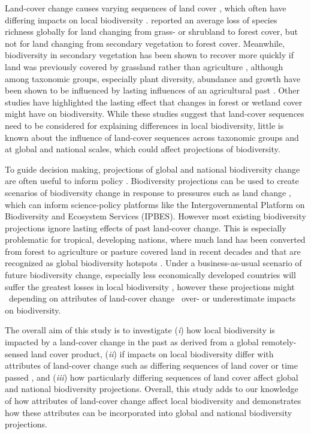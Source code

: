 Land-cover change causes varying sequences of land cover \citep{Nowosad2018}, which often have differing impacts on local biodiversity \citep{Foster2003}. \cite{Bremer2010} reported an average loss of species richness globally for land changing from grass- or shrubland to forest cover, but not for land changing from secondary vegetation to forest cover. Meanwhile, biodiversity in secondary vegetation has been shown to recover more quickly if land was previously covered by grassland rather than agriculture \citep{Dyer2010}, although among taxonomic groups, especially plant diversity, abundance and growth have been shown to be influenced by lasting influences of an agricultural past \citep{Chazdon2003,Fraterrigo2006,DeFrenne2010,Perring2018}. Other studies have highlighted the lasting effect that changes in forest \citep{Gonzalez2016} or wetland cover \citep{Halstead2014} might have on biodiversity. While these studies suggest that land-cover sequences need to be considered for explaining differences in local biodiversity, little is known about the influence of land-cover sequences across taxonomic groups and at global and national scales, which could affect projections of biodiversity.

To guide decision making, projections of global and national biodiversity change are often useful to inform policy \citep{Pereira2010,Visconti2014}. Biodiversity projections can be used to create scenarios of biodiversity change in response to pressures such as land change \citep{Newbold2015,Newbold2016a,Titeux2016}, which can inform science-policy platforms \citep{Harfoot2014,Visconti2014,Purvis2018} like the Intergovernmental Platform on Biodiversity and Ecosystem Services (IPBES). However most existing biodiversity projections ignore lasting effects of past land-cover change. This is especially problematic for tropical, developing nations, where much land has been converted from forest to agriculture or pasture covered land in recent decades \citep{Curtis2018} and that are recognized as global biodiversity hotspots \citep{Brooks2002,Laurance2014b}. Under a business-as-usual scenario of future biodiversity change, especially less economically developed countries will suffer the greatest losses in local biodiversity \citep{Newbold2015,Visconti2014}, however these projections might \textendash\ depending on attributes of land-cover change \textendash\ over- or underestimate impacts on biodiversity.

The overall aim of this study is to investigate (\textit{i}) how local biodiversity is impacted by a land-cover change in the past as derived from a global remotely-sensed land cover product, (\textit{ii}) if impacts on local biodiversity differ with attributes of land-cover change such as differing sequences of land cover or time passed \citep{Watson2014}, and (\textit{iii}) how particularly differing sequences of land cover affect global and national biodiversity projections. Overall, this study adds to our knowledge of how attributes of land-cover change affect local biodiversity and demonstrates how these attributes can be incorporated into global and national biodiversity projections.   


